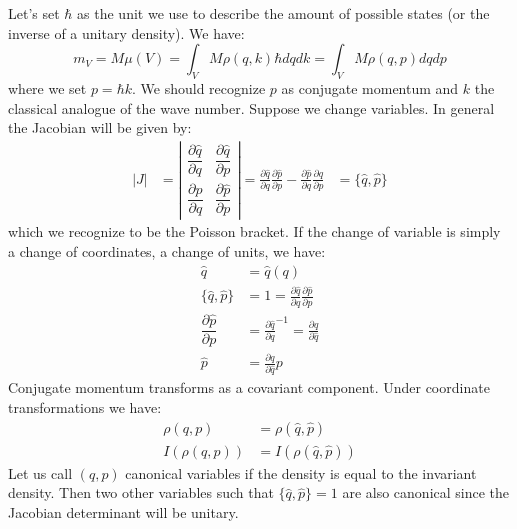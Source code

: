 \documentclass[11pt]{article}
\begin{document}
Let's set $\hbar$ as the unit we use to describe the amount of possible states (or the inverse of a unitary density). We have:
\begin{equation}
m_V = M \mu(V) =\int_V M \rho(q, k) \hbar dq dk = \int_V M \rho(q, p) dq dp
\end{equation}
where we set $p=\hbar k$. We should recognize $p$ as conjugate momentum and $k$ the classical analogue of the wave number. Suppose we change variables. In general the Jacobian will be given by:
\begin{equation}
\label{Poisson}
\begin{aligned}
|J| &= \left| \begin{matrix}
\dfrac{\partial \hat{q}}{\partial q} & \dfrac{\partial \hat{q}}{\partial p} \\[2.2ex]
\dfrac{\partial \hat{p}}{\partial q} & \dfrac{\partial \hat{p}}{\partial p} \end{matrix} \right| = \frac{\partial \hat{q}}{\partial q} \frac{\partial \hat{p}}{\partial p} - \frac{\partial \hat{p}}{\partial q} \frac{\partial \hat{q}}{\partial p} &= \{\hat{q}, \hat{p}\}
\end{aligned}
\end{equation}
which we recognize to be the Poisson bracket. If the change of variable is simply a change of coordinates, a change of units, we have:
\begin{equation}
\label{coordinate_change}
\begin{aligned}
\hat{q} &= \hat{q}(q) \\
\{\hat{q}, \hat{p}\} &= 1 = \frac{\partial \hat{q}}{\partial q} \frac{\partial \hat{p}}{\partial p} \\
\dfrac{\partial \hat{p}}{\partial p} &= \frac{\partial \hat{q}}{\partial q} ^{-1} = \frac{\partial q}{\partial \hat{q}} \\
\hat{p} &= \frac{\partial q}{\partial \hat{q}} p
\end{aligned}
\end{equation}
Conjugate momentum transforms as a covariant component. Under coordinate transformations we have:
\begin{equation}
\label{density_invariance}
\begin{aligned}
\rho(q,p) &= \rho(\hat{q}, \hat{p}) \\
I(\rho(q,p)) &= I(\rho(\hat{q},\hat{p}))
\end{aligned}
\end{equation}
Let us call $(q,p)$ canonical variables if the density is equal to the invariant density. Then two other variables such that $\{\hat{q}, \hat{p}\}=1$ are also canonical since the Jacobian determinant will be unitary.
\end{document}
